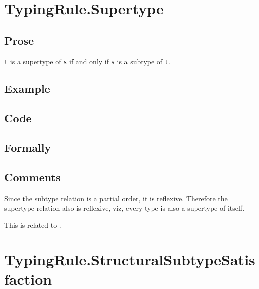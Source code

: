 \documentclass{book}
\begin{document}
\section{TypingRule.Supertype}

  \subsection{Prose}
  \texttt{t} is a supertype of \texttt{s} if and only if \texttt{s} is a subtype of \texttt{t}.
  

  \subsection{Example}

  \subsection{Code}

\begin{emptyformal}
  \subsection{Formally}
\end{emptyformal}

\subsection{Comments}
  Since the subtype relation is a partial order, it is reflexive. Therefore the
  supertype relation also is reflexive, viz, every type is also a supertype of
  itself.

  This is related to .

\section{TypingRule.StructuralSubtypeSatisfaction\label{sec:TypingRule.SubtypeSatisfaction}}
\end{document}
